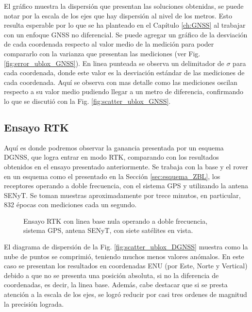 \documentclass[a4paper,12pt,oneside,onecolumn,final,openright]{book}%
\begin{document}
	El gráfico muestra la dispersión que presentan las soluciones obtenidas, se puede notar por la escala de los ejes que hay dispersión al nivel de los metros. Esto resulta esperable por lo que se ha planteado en el Capítulo \ref{ch:GNSS} al trabajar con un enfoque GNSS no diferencial. Se puede agregar un gráfico de la desviación de cada coordenada respecto al valor medio de la medición para poder compararlo con la varianza que presentan las mediciones (ver Fig. \ref{fig:error_ublox_GNSS}). En linea punteada se observa un delimitador de $\sigma$ para cada coordenada, donde este valor es la desviación estándar de las mediciones de cada coordenada. Aquí se observa con mas detalle como las mediciones oscilan respecto a su valor medio pudiendo llegar a un metro de diferencia, confirmando lo que se discutió con la Fig. \ref{fig:scatter_ublox_GNSS}.

\subsection{Ensayo RTK}
	Aquí es donde podremos observar la ganancia presentada por un esquema DGNSS, que logra entrar en modo RTK, comparando con los resultados obtenidos en el ensayo presentado anteriormente. Se trabaja con la base y el rover en un esquema como el presentado en la Sección \ref{sec:esquema_ZBL}, los receptores operando a doble frecuencia, con el sistema GPS y utilizando la antena SENyT. Se toman muestras aproximadamente por trece minutos, en particular, 832 épocas con mediciones cada un segundo. 
	
\begin{figure}
\centering
{}

\centering
{}
\caption{Ensayo RTK con linea base nula operando a doble frecuencia, sistema GPS, antena SENyT, con siete satélites en vista.}
\label{fig:ensayoDGNSS_ublox}
\end{figure}
	
	El diagrama de dispersión de la Fig. \ref{fig:scatter_ublox_DGNSS} muestra como la nube de puntos se comprimió, teniendo muchos menos valores anómalos. En este caso se presentan los resultados en coordenadas ENU (por Este, Norte y Vertical) debido a que no se presenta una posición absoluta, si no la diferencia de coordenadas, es decir, la linea base. Además, cabe destacar que si se presta atención a la escala de los ejes, se logró reducir por casi tres ordenes de magnitud la precisión lograda. 
	
\end{document}
